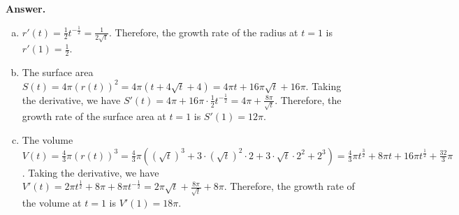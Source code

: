 \documentclass[11pt,letterpaper]{article}
\newcommand{\answer}{\noindent \textbf{Answer. }}
\begin{document}
\answer
\begin{enumerate}[(a)]
    \item $r'(t) = \frac{1}{2}t^{-\frac{1}{2}} = \frac{1}{2\sqrt{t}}$.  Therefore, the growth rate of the radius at $t=1$ is $r'(1) = \frac{1}{2}$.
    \item The surface area $S(t) = 4\pi(r(t))^2 = 4\pi(t+4\sqrt{t}+4) = 4\pi t + 16 \pi \sqrt{t} + 16 \pi$.  Taking the derivative, we have $S'(t) = 4\pi + 16\pi\cdot \frac{1}{2}t^{-\frac{1}{2}} = 4\pi + \frac{8\pi}{\sqrt{t}}$.  Therefore, the growth rate of the surface area at $t=1$ is $S'(1) = 12\pi$.
    \item The volume $V(t) = \frac{4}{3}\pi(r(t))^3 = \frac{4}{3}\pi((\sqrt{t})^3+3 \cdot (\sqrt{t})^2 \cdot 2+ 3 \cdot \sqrt{t} \cdot 2^2 + 2^3) = \frac{4}{3}\pi t^{\frac{3}{2}} + 8 \pi t + 16 \pi t^{\frac{1}{2}} + \frac{32}{3}\pi$.  Taking the derivative, we have $V'(t) = 2\pi t^{\frac{1}{2}} + 8 \pi + 8 \pi t^{-\frac{1}{2}} = 2\pi\sqrt{t} + \frac{8 \pi}{\sqrt{t}} + 8 \pi$.  Therefore, the growth rate of the volume at $t=1$ is $V'(1) = 18\pi$.
\end{enumerate}\vspace{6mm}
\end{document}
